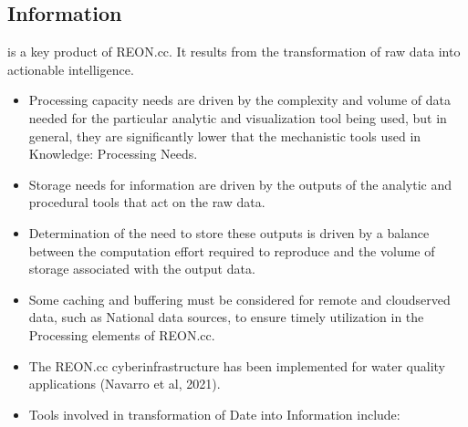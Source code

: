 \documentclass[letterpaper,12pt,english]{book}
\begin{document}
\subsection{Information}
\label{\detokenize{requirements/information/index:information}}\label{\detokenize{requirements/information/index::doc}}
\sphinxAtStartPar
{} is a key product of REON.cc. It results from the transformation of raw data into actionable intelligence.
\begin{itemize}
\item {} 
\sphinxAtStartPar
Processing capacity needs are driven by the complexity and volume of data needed for the particular analytic and visualization tool being used, but in general, they are significantly lower that the mechanistic tools used in Knowledge: Processing Needs.

\item {} 
\sphinxAtStartPar
Storage needs for information are driven by the outputs of the analytic and procedural tools that act on the raw data.

\item {} 
\sphinxAtStartPar
Determination of the need to store these outputs is driven by a balance between the computation effort required to reproduce and the volume of storage associated with the output data.

\item {} 
\sphinxAtStartPar
Some caching and buffering must be considered for remote and cloud\sphinxhyphen{}served data, such as National data sources, to ensure timely utilization in the Processing elements of REON.cc.

\item {} 
\sphinxAtStartPar
The REON.cc cyberinfrastructure has been implemented for water quality applications (Navarro et al, 2021).

\item {} 
\sphinxAtStartPar
Tools involved in transformation of Date into Information include:

\end{itemize}
\end{document}
